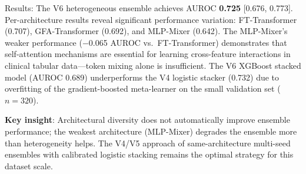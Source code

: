 Results: The V6 heterogeneous ensemble achieves AUROC \textbf{0.725} [0.676, 0.773]. Per-architecture results reveal significant performance variation: FT-Transformer (0.707), GFA-Transformer (0.692), and MLP-Mixer (0.642). The MLP-Mixer's weaker performance ($-$0.065 AUROC vs.\ FT-Transformer) demonstrates that self-attention mechanisms are essential for learning cross-feature interactions in clinical tabular data---token mixing alone is insufficient. The V6 XGBoost stacked model (AUROC 0.689) underperforms the V4 logistic stacker (0.732) due to overfitting of the gradient-boosted meta-learner on the small validation set ($n=320$).

\textbf{Key insight}: Architectural diversity does not automatically improve ensemble performance; the weakest architecture (MLP-Mixer) degrades the ensemble more than heterogeneity helps. The V4/V5 approach of same-architecture multi-seed ensembles with calibrated logistic stacking remains the optimal strategy for this dataset scale.

\begin{table}[htbp]
\centering
\caption{Improved Training Strategies --- All Models on Same Test Set}
\small
{}
\label{tab:improved_strategies}
\end{table}

